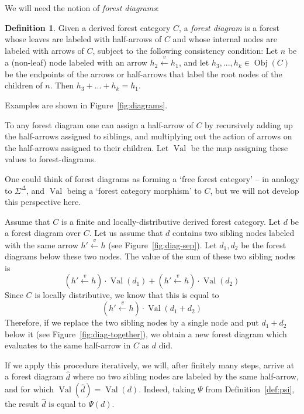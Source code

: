 \documentclass[sigplan,9pt]{acmart}\settopmatter{printfolios=true,printccs=false,printacmref=false}
\newcounter{thm}
\newcounter{theorem}
\theoremstyle{definition}
\newtheorem{defin}[thm]{Definition}
\newcommand{\carrow}[3]{#3 \xleftarrow{#2} #1 }
\newcommand{\Obj}[0]{{\operatorname{Obj}}}
\begin{document}
We will need the notion of \emph{forest diagrams}:

\begin{defin}
Given a derived forest category $C$, a \emph{forest diagram} is a forest whose leaves are labeled with half-arrows of $C$ and whose internal nodes are labeled with arrows of $C$, subject to the following consistency condition: Let $n$ be a (non-leaf) node labeled with an arrow $\carrow{h_1}{v}{h_2}$, and let $h_3, ..., h_k \in \Obj(C)$ be the endpoints of the arrows or half-arrows that label the root nodes of the children of $n$. Then $h_3 + ... + h_k = h_1$.
\end{defin}

Examples are shown in Figure~\ref{fig:diagrams}.

To any forest diagram one can assign a half-arrow of $C$ by recursively adding up the half-arrows assigned to siblings, and multiplying out the action of arrows on the half-arrows assigned to their children.
Let $\operatorname{Val}$ be the map assigning these values to forest-diagrams.

One could think of forest diagrams as forming a `free forest category' -- in analogy to $\Sigma^\Delta$, and $\operatorname{Val}$ being a `forest category morphism' to $C$, but we will not develop this perspective here.

Assume that $C$ is a finite and locally-distributive derived forest category.
Let $d$ be a forest diagram over $C$.
Let us assume that $d$ contains two sibling nodes labeled with the same arrow $\carrow{h}{v}{h'}$ (see Figure~\ref{fig:diag-sep}).
Let $d_1, d_2$ be the forest diagrams below these two nodes.
The value of the sum of these two sibling nodes is
$$\left(\carrow{h}{v}{h'}\right) \cdot \operatorname{Val}(d_1) + \left(\carrow{h}{v}{h'}\right) \cdot \operatorname{Val}(d_2)$$
Since $C$ is locally distributive, we know that this is equal to
$$\left(\carrow{h}{v}{h'}\right) \cdot \operatorname{Val}(d_1 + d_2)$$
Therefore, if we replace the two sibling nodes by a single node and put $d_1+d_2$ below it (see Figure~\ref{fig:diag-together}), we obtain a new forest diagram which evaluates to the same half-arrow in $C$ as $d$ did.

If we apply this procedure iteratively, we will, after finitely many steps, arrive at a forest diagram $\widehat{d}$ where no two sibling nodes are labeled by the same half-arrow, and for which $\operatorname{Val}(\widehat{d}) = \operatorname{Val}(d)$.
Indeed, taking $\Psi$ from Definition~\ref{def:psi}, the result $\widehat{d}$ is equal to $\Psi(d)$.
\end{document}
